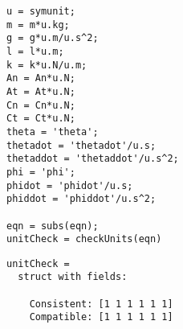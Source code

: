 \begin{lstlisting}[frame=lines,style=Matlab-editor]
% Checking EOM Units
u = symunit;
m = m*u.kg;
g = g*u.m/u.s^2;
l = l*u.m;
k = k*u.N/u.m;
An = An*u.N;
At = At*u.N;
Cn = Cn*u.N;
Ct = Ct*u.N;
theta = 'theta';
thetadot = 'thetadot'/u.s;
thetaddot = 'thetaddot'/u.s^2;
phi = 'phi';
phidot = 'phidot'/u.s;
phiddot = 'phiddot'/u.s^2;

eqn = subs(eqn);
unitCheck = checkUnits(eqn)
\end{lstlisting}
\color{gray} \begin{verbatim}
unitCheck = 
  struct with fields:

    Consistent: [1 1 1 1 1 1]
    Compatible: [1 1 1 1 1 1]
\end{verbatim} \color{black}

